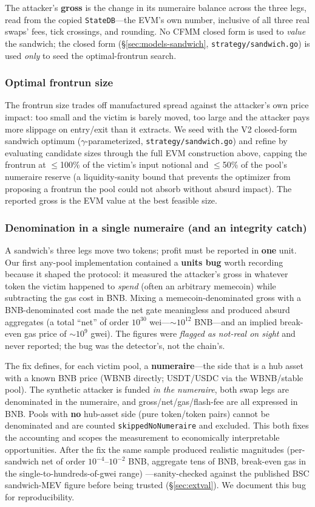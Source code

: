 \documentclass[11pt]{article}
\newcommand{\code}[1]{\texttt{#1}}
\begin{document}
The attacker's \textbf{gross} is the change in its numeraire balance across the three
legs, read from the copied \code{StateDB}---the EVM's own number, inclusive of all
three real swaps' fees, tick crossings, and rounding. No CFMM closed form is used to
\emph{value} the sandwich; the closed form (\S\ref{sec:models-sandwich},
\code{strategy/sandwich.go}) is used \emph{only} to seed the optimal-frontrun search.

\subsubsection{Optimal frontrun size}
The frontrun size trades off manufactured spread against the attacker's own price
impact: too small and the victim is barely moved, too large and the attacker pays
more slippage on entry/exit than it extracts. We seed with the V2 closed-form
sandwich optimum ($\gamma$-parameterized, \code{strategy/sandwich.go}) and refine by
evaluating candidate sizes through the full EVM construction above, capping the
frontrun at $\leq$100\% of the victim's input notional and $\leq$50\% of the pool's
numeraire reserve (a liquidity-sanity bound that prevents the optimizer from
proposing a frontrun the pool could not absorb without absurd impact). The reported
gross is the EVM value at the best feasible size.

\subsubsection{Denomination in a single numeraire (and an integrity catch)}
\label{sec:numeraire}
A sandwich's three legs move two tokens; profit must be reported in \textbf{one}
unit. Our first any-pool implementation contained a \textbf{units bug} worth
recording because it shaped the protocol: it measured the attacker's gross in
whatever token the victim happened to \emph{spend} (often an arbitrary memecoin)
while subtracting the gas cost in BNB. Mixing a memecoin-denominated gross with a
BNB-denominated cost made the net gate meaningless and produced absurd aggregates (a
total ``net'' of order $10^{30}$ wei---$\sim$$10^{12}$ BNB---and an implied
break-even gas price of $\sim$$10^{9}$ gwei). The figures were \emph{flagged as
not-real on sight} and never reported; the bug was the detector's, not the chain's.

The fix defines, for each victim pool, a \textbf{numeraire}---the side that is a hub
asset with a known BNB price (WBNB directly; USDT/USDC via the WBNB/stable pool). The
synthetic attacker is funded \emph{in the numeraire}, both swap legs are denominated
in the numeraire, and gross/net/gas/flash-fee are all expressed in BNB. Pools with
\textbf{no} hub-asset side (pure token/token pairs) cannot be denominated and are
counted \code{skippedNoNumeraire} and excluded. This both fixes the accounting and
scopes the measurement to economically interpretable opportunities. After the fix the
same sample produced realistic magnitudes (per-sandwich net of order $10^{-4}$--$10^{-2}$
BNB, aggregate tens of BNB, break-even gas in the single-to-hundreds-of-gwei range)
---sanity-checked against the published BSC sandwich-MEV figure before being trusted
(\S\ref{sec:extval}). We document this bug for reproducibility.
\end{document}
